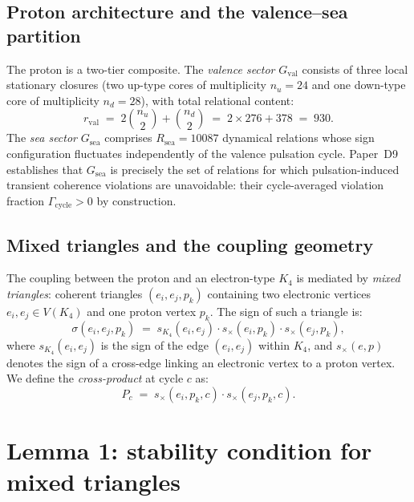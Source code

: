 \documentclass[11pt,a4paper]{article}
\theoremstyle{definition}
\newcommand{\Rsea}{R_{\mathrm{sea}}}
\newcommand{\rval}{r_{\mathrm{val}}}
\newcommand{\Kfour}{K_4}
\newcommand{\Gval}{G_{\mathrm{val}}}
\newcommand{\Gsea}{G_{\mathrm{sea}}}
\begin{document}
\subsection{Proton architecture and the valence--sea partition}

The proton is a two-tier composite. The \emph{valence sector} $\Gval$ consists of three local stationary closures (two up-type cores of multiplicity $n_u = 24$ and one down-type core of multiplicity $n_d = 28$), with total relational content:
\begin{equation}
\label{eq:r_val}
\rval \;=\; 2\binom{n_u}{2} + \binom{n_d}{2} \;=\; 2\times 276 + 378 \;=\; 930.
\end{equation}
The \emph{sea sector} $\Gsea$ comprises $\Rsea = 10087$ dynamical relations whose sign configuration fluctuates independently of the valence pulsation cycle. Paper~D9~\cite{Leakage_18_PDL_2026} establishes that $\Gsea$ is precisely the set of relations for which pulsation-induced transient coherence violations are unavoidable: their cycle-averaged violation fraction $\Gamma_{\mathrm{cycle}} > 0$ by construction.

\subsection{Mixed triangles and the coupling geometry}

The coupling between the proton and an electron-type $\Kfour$ is mediated by \emph{mixed triangles}: coherent triangles $(e_i, e_j, p_k)$ containing two electronic vertices $e_i, e_j \in V(\Kfour)$ and one proton vertex $p_k$. The sign of such a triangle is:
\begin{equation}
\label{eq:mixed_sign}
\sigma(e_i, e_j, p_k) \;=\; s_{\Kfour}(e_i,e_j)\cdot s_{\times}(e_i,p_k)\cdot s_{\times}(e_j,p_k),
\end{equation}
where $s_{\Kfour}(e_i,e_j)$ is the sign of the edge $(e_i,e_j)$ within $\Kfour$, and $s_{\times}(e,p)$ denotes the sign of a cross-edge linking an electronic vertex to a proton vertex. We define the \emph{cross-product} at cycle $c$ as:
\begin{equation}
\label{eq:cross_product}
P_c \;=\; s_{\times}(e_i,p_k,c)\cdot s_{\times}(e_j,p_k,c).
\end{equation}

\section{Lemma 1: stability condition for mixed triangles}
\label{sec:L1}
\end{document}
